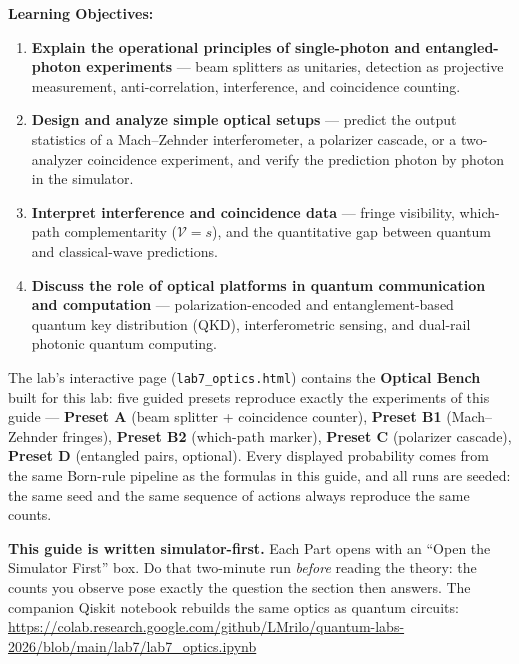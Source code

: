 \documentclass[a4paper,11pt]{article}
\begin{document}
\vspace{0.3cm}
\noindent\textbf{Learning Objectives:}
\begin{enumerate}
    \item \textbf{Explain the operational principles of single-photon and
          entangled-photon experiments} --- beam splitters as unitaries, detection as
          projective measurement, anti-correlation, interference, and coincidence
          counting.
    \item \textbf{Design and analyze simple optical setups} --- predict the output
          statistics of a Mach--Zehnder interferometer, a polarizer cascade, or a
          two-analyzer coincidence experiment, and verify the prediction photon by
          photon in the simulator.
    \item \textbf{Interpret interference and coincidence data} --- fringe visibility,
          which-path complementarity ($\mathcal{V} = s$), and the quantitative gap
          between quantum and classical-wave predictions.
    \item \textbf{Discuss the role of optical platforms in quantum communication and
          computation} --- polarization-encoded and entanglement-based quantum key
          distribution (QKD),
          interferometric sensing, and dual-rail photonic quantum computing.
\end{enumerate}

\begin{simulatorbox}
The lab's interactive page (\texttt{lab7\_optics.html}) contains the
\textbf{Optical Bench} built for this lab: five guided presets reproduce exactly the
experiments of this guide --- \textbf{Preset A} (beam splitter + coincidence counter),
\textbf{Preset B1} (Mach--Zehnder fringes), \textbf{Preset B2} (which-path marker),
\textbf{Preset C} (polarizer cascade), \textbf{Preset D} (entangled pairs, optional).
Every displayed probability comes from the same Born-rule pipeline as the formulas in
this guide, and all runs are seeded: the same seed and the same sequence of actions
always reproduce the same counts.

\medskip
\textbf{This guide is written simulator-first.} Each Part opens with an ``Open the
Simulator First'' box. Do that two-minute run \emph{before} reading the theory: the
counts you observe pose exactly the question the section then answers. The companion
Qiskit notebook rebuilds the same optics as quantum circuits:\\[4pt]
\url{https://colab.research.google.com/github/LMrilo/quantum-labs-2026/blob/main/lab7/lab7_optics.ipynb}
\end{simulatorbox}
\end{document}
